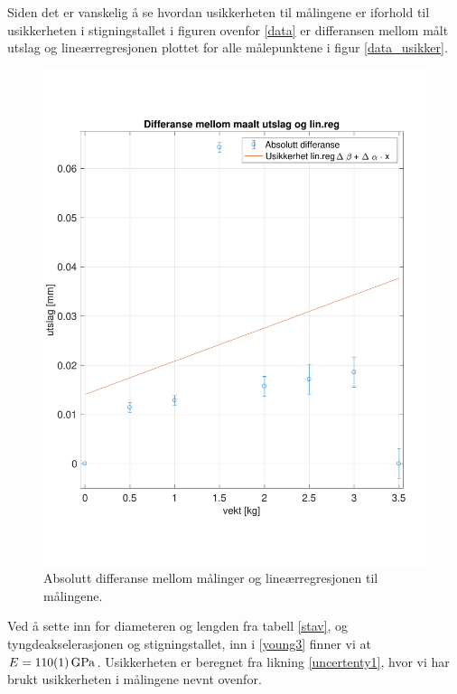 \documentclass[%
 reprint,
 amsmath,amssymb,
 aps,
 norsk,
 booktabs
]{revtex4-1}
\begin{document}
Siden det er vanskelig å se hvordan usikkerheten til målingene er iforhold til usikkerheten i stigningstallet i figuren ovenfor \vref{data} er differansen mellom målt utslag og lineærregresjonen plottet for alle målepunktene i figur \vref{data_usikker}.
\begin{figure}[h!]
  \centering
  \includegraphics[scale=0.4]{usikkerhet.pdf}
  \caption{Absolutt differanse mellom målinger og lineærregresjonen til målingene.}
  \label{data_usikker}
\end{figure}
Ved å sette inn for diameteren og lengden fra tabell \vref{stav}, og tyngdeakselerasjonen og stigningstallet, inn i \eqref{young3} finner vi at $E=\SI{110\pm1}{\giga\pascal}$. Usikkerheten er beregnet fra likning \eqref{uncertenty1}, hvor vi har brukt usikkerheten i målingene nevnt ovenfor.
\end{document}
